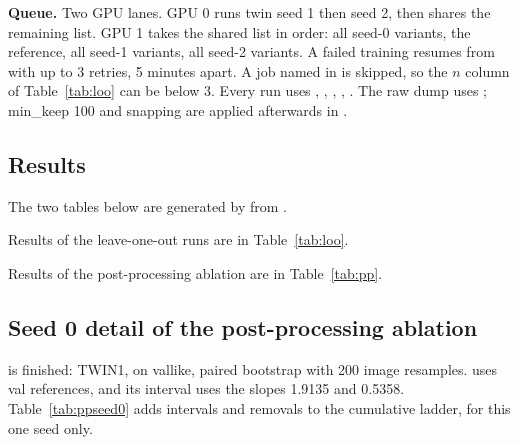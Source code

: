 \textbf{Queue.} Two GPU lanes. GPU 0 runs twin seed 1 then seed 2, then shares the remaining list. GPU 1 takes the shared list in order: all seed-0 variants, the reference, all seed-1 variants, all seed-2 variants. A failed training resumes from  with up to 3 retries, 5 minutes apart. A job named in  is skipped, so the $n$ column of Table~\ref{tab:loo} can be below 3. Every run uses , , , , . The raw dump uses ; min\_keep 100 and snapping are applied afterwards in .

\subsection{Results}

The two tables below are generated by  from .

\begingroup
\let\table\heretable
\let\endtable\endheretable
Results of the leave-one-out runs are in Table~\ref{tab:loo}.

Results of the post-processing ablation are in Table~\ref{tab:pp}.
\endgroup

\subsection{Seed 0 detail of the post-processing ablation}

 is finished: TWIN1, on vallike, paired bootstrap with 200 image resamples. \dm{} uses val references, and its interval uses the slopes 1.9135 and 0.5358. Table~\ref{tab:ppseed0} adds intervals and removals to the cumulative ladder, for this one seed only.

